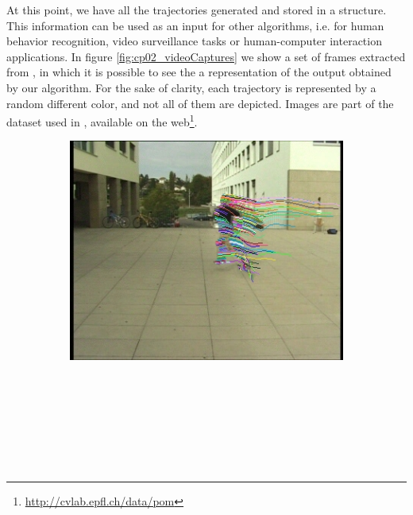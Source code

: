At this point, we have all the trajectories generated and stored in a structure. This information can be used as 
an input for other algorithms, i.e. for human behavior recognition, video surveillance tasks or human-computer 
interaction applications. In figure \ref{fig:cp02_videoCaptures} we show a set of frames extracted from , in which it is possible to see the a representation of the output obtained by our 
algorithm. For the sake of clarity, each trajectory is represented by a random different color, and not all of them 
are depicted. Images are part of the dataset used in \cite{berclaz2011multiple}, available on the 
web\footnote{\url{http://cvlab.epfl.ch/data/pom}}.

\begin{figure}[t]
        \centering
        \begin{subfigure}[b]{0.24\textwidth}
                \centering
                \caption{~}
                \includegraphics[width=\textwidth, trim=6 0 5 1, clip]{fig5.jpg}
                \label{fig:cp02_videoCapture1}
        \end{subfigure}%
        ~ %
        \begin{subfigure}[b]{0.24\textwidth}
                \centering
		\caption{~}

\end{subfigure}
\end{figure}

